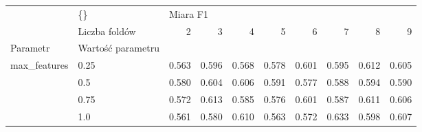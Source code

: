 \begin{tabular}{llrrrrrrrr}
\hline
             & \{\} & \multicolumn{8}{l}{Miara F1} \\
             & Liczba foldów &        2 &      3 &      4 &      5 &      6 &      7 &      8 &      9 \\
Parametr & Wartość parametru &          &        &        &        &        &        &        &        \\
\hline
max\_features & 0.25 &    0.563 &  0.596 &  0.568 &  0.578 &  0.601 &  0.595 &  0.612 &  0.605 \\
             & 0.5 &    0.580 &  0.604 &  0.606 &  0.591 &  0.577 &  0.588 &  0.594 &  0.590 \\
             & 0.75 &    0.572 &  0.613 &  0.585 &  0.576 &  0.601 &  0.587 &  0.611 &  0.606 \\
             & 1.0 &    0.561 &  0.580 &  0.610 &  0.563 &  0.572 &  0.633 &  0.598 &  0.607 \\
\hline
\end{tabular}
